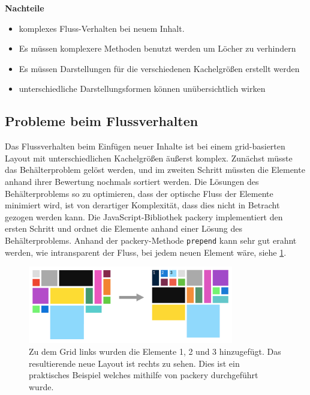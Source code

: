\documentclass[12pt,twoside]{book}
\begin{document}
\begin{itemize}
  \textbf{Nachteile}\\
  \begin{itemize}
    \item komplexes Fluss-Verhalten bei neuem Inhalt.
    \item Es müssen komplexere Methoden benutzt werden um Löcher zu verhindern
    \item Es müssen Darstellungen für die verschiedenen Kachelgrößen erstellt werden
    \item unterschiedliche Darstellungsformen können unübersichtlich wirken
  \end{itemize}

\end{itemize}

  \subsection{Probleme beim Flussverhalten}
  Das Flussverhalten beim Einfügen neuer Inhalte ist bei einem grid-basierten Layout mit unterschiedlichen Kachelgrößen äußerst komplex. Zunächst müsste das Behälterproblem gelöst werden, und im zweiten Schritt müssten die Elemente anhand ihrer Bewertung nochmals sortiert werden. Die Lösungen des Behälterproblems so zu optimieren, dass der optische Fluss der Elemente minimiert wird, ist von derartiger Komplexität, dass dies nicht in Betracht gezogen werden kann. Die JavaScript-Bibliothek packery\cite{packery} implementiert den ersten Schritt und ordnet die Elemente anhand einer Lösung des Behälterproblems. Anhand der packery-Methode \texttt{prepend} kann sehr gut erahnt werden, wie intransparent der Fluss, bei jedem neuen Element wäre, siehe \ref{fig:grid_flow}.

  \begin{figure}[htbp]
    \centering
    \includegraphics[width=0.8\textwidth]{images/grid_flow.png}
    \caption{Zu dem Grid links wurden die Elemente 1, 2 und 3 hinzugefügt. Das resultierende neue Layout ist rechts zu sehen. Dies ist ein praktisches Beispiel welches mithilfe von packery durchgeführt wurde.}
    \label{fig:grid_flow}
  \end{figure}
\end{document}
